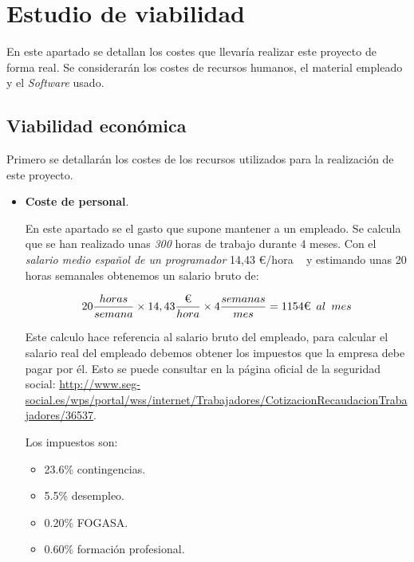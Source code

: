 \section{Estudio de viabilidad}
En este apartado se detallan los costes que llevaría realizar este proyecto de forma real. Se considerarán los costes de recursos humanos, el material empleado y el \emph{Software} usado. 

\subsection{Viabilidad económica}
Primero se detallarán los costes de los recursos utilizados para la realización de este proyecto.

\begin{itemize}
	\item \textbf{Coste de personal}.
	
	En este apartado se el gasto que supone mantener a un empleado. Se calcula que se han realizado unas \emph{300} horas de trabajo durante 4 meses. 
	Con el \textit{salario medio español de un programador} 14,43 €/hora ~\cite{SalarioProgramador} y estimando unas 20 horas semanales obtenemos un salario bruto de:
	

$$ 20\frac{horas}{semana}\times14,43\frac{\text{€}}{hora}\times4\frac{semanas}{mes}=1154\text{€}\hspace{0.5em}al\hspace{0.5em}mes  $$

Este calculo hace referencia al salario bruto del empleado, para calcular el salario real del empleado debemos  obtener los impuestos que la empresa debe pagar por él. Esto se puede consultar en la página oficial de la seguridad social: \url{http://www.seg-social.es/wps/portal/wss/internet/Trabajadores/CotizacionRecaudacionTrabajadores/36537}.

Los impuestos son:
\begin{itemize}
	\tightlist
	\item 23.6\% contingencias.
	\item 5.5\% desempleo.
	\item 0.20\% FOGASA.
	\item 0.60\% formación profesional.
\end{itemize}




\end{itemize}
